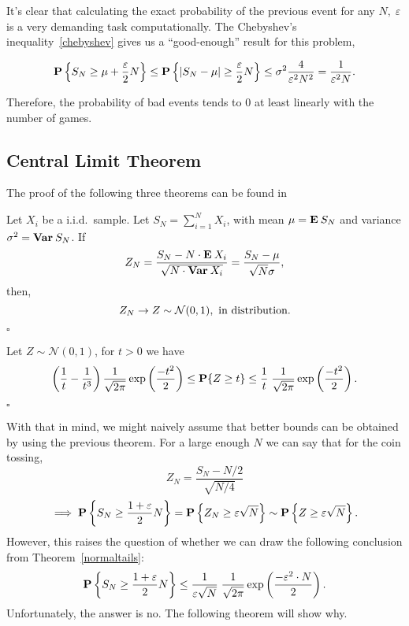 It's clear that calculating the exact probability of the previous event for any $N,\; \varepsilon$ is a very demanding task computationally. The Chebyshev's inequality~\ref{chebyshev} gives us a ``good-enough'' result for this problem,

\[ \P\left\{S_N \geq \mu +  \frac{\varepsilon}{2} N\right\} \leq 
\P\left\{|S_N-\mu| \geq  \frac{\varepsilon}{2} N\right\} \leq \sigma^2 \frac{4}{\varepsilon^2 N^2} = \frac{1}{\varepsilon^2 N}.\] 

Therefore, the probability of bad events tends to 0 at least linearly with the number of games.

\subsection{Central Limit Theorem}

The proof of the following three theorems can be found in~\cite{boucheron2003concentration}

\begin{theorem}\label{centrallimit}
    Let $X_i$ be a i.i.d.~sample. Let $S_N = \sum_{i = 1}^N X_i$, with mean $\mu = \E S_N$ and variance $\sigma^2 = \Var S_N$. If  
    \[ Z_N =  \frac{S_N - N\cdot \E X_i}{\sqrt{N \cdot \Var X_i}} =  \frac{S_N - \mu}{\sqrt{N}\sigma},\] 
    then,
    \[ Z_N \to Z \sim \mathcal{N}(0,1),\hbox{ in distribution.} \] 

    \hfill $\square$
\end{theorem}

\vspace*{2em}

\begin{theorem}\label{normaltails}
    Let $Z\sim \mathcal{N}(0,1)$, for $t>0$ we have
    \[ \left( \frac{1}{t}-\frac{1}{t^3}\right) \frac{1}{\sqrt{2\pi}} \exp\left(\frac{-t^2}{2}\right) \leq \P\{Z \geq t\} \leq \frac{1}{t}\;\frac{1}{\sqrt{2\pi}} \exp\left(\frac{-t^2}{2}\right). \]

    \hfill $\square$
\end{theorem}

With that in mind, we might naively assume that better bounds can be obtained by using the previous theorem. For a large enough $N$ we can say that for the coin tossing,
\[ Z_N = \frac{S_N- N/2}{\sqrt{N/4}} \] 
\[ \implies \P \left\{S_N \geq \frac{1+\varepsilon}{2} N \right\} = \P\left\{Z_N \geq \varepsilon \sqrt{N} \right\} \sim \P\left\{Z \geq \varepsilon \sqrt{N} \right\}.\]
However, this raises the question of whether we can draw the following conclusion from Theorem~\ref{normaltails}:
\[ \P \left\{S_N \geq \frac{1+\varepsilon}{2} N \right\} \leq \frac{1}{\varepsilon \sqrt{N}}\;\frac{1}{\sqrt{2\pi}} \exp\left(\frac{-\varepsilon^2 \cdot N}{2}\right). \]
Unfortunately, the answer is no. The following theorem will show why.


